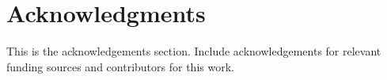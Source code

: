 \section{Acknowledgments}
This is the acknowledgements section.
Include acknowledgements for relevant funding sources and contributors for
this work.
